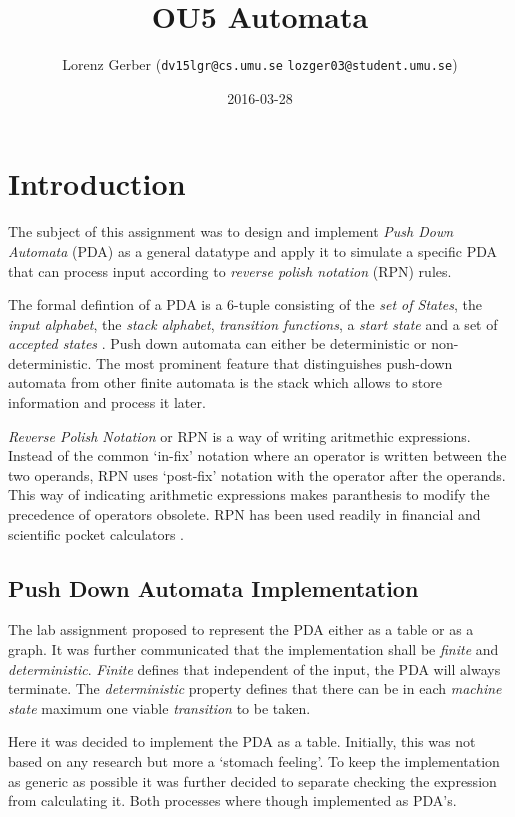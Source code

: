 \documentclass[a4paper,11pt,twoside]{article}
\title{OU5 Automata}
\author{Lorenz Gerber ({\tt{dv15lgr@cs.umu.se}} {\tt{lozger03@student.umu.se}})}
\date{2016-03-28}
\begin{document}
\lstset{language=C}
\maketitle
\thispagestyle{empty}
\newpage
\tableofcontents
\thispagestyle{empty}
\newpage

\clearpage
{}

\section{Introduction} 
The subject of this assignment was to design and implement \textit{Push Down
Automata} (PDA) as a general datatype and apply it to simulate a
specific PDA that can process input according to \textit{reverse
  polish notation} (RPN) rules.

The formal defintion of a PDA is a 6-tuple consisting of the \textit{set of
States}, the \textit{input alphabet}, the \textit{stack alphabet},
\textit{transition functions}, a \textit{start state} and a set of
\textit{accepted states} \cite[p. 113]{sipser2012}. Push down automata can either be deterministic or
non-deterministic. The most prominent feature that distinguishes
push-down automata from other finite automata is the stack which allows to store information and process it later. 

\textit{Reverse Polish Notation} or RPN is a way of writing aritmethic
expressions. Instead of the common `in-fix' notation where an operator
is written between the two operands, RPN uses `post-fix' notation with
the operator after the operands. This way of indicating arithmetic
expressions makes paranthesis to modify the precedence of operators
obsolete. RPN has been used readily in financial and scientific pocket
calculators \cite{rpn}.  

\subsection{Push Down Automata Implementation}
The lab assignment proposed to represent the PDA either as a table or
as a graph. It was further communicated that the implementation shall be
\textit{finite} and \textit{deterministic}. \textit{Finite} defines
that independent of the input, the PDA will always terminate. The
\textit{deterministic} property defines that there can be in each
\textit{machine state} maximum one viable \textit{transition} to be
taken.   

Here it was decided to implement the PDA as a table. Initially, this
was not based on any research but more a `stomach feeling'.  To keep
the implementation as generic as possible it was further decided to 
separate checking the expression from calculating it. Both processes
where though implemented as PDA's. 
\end{document}
